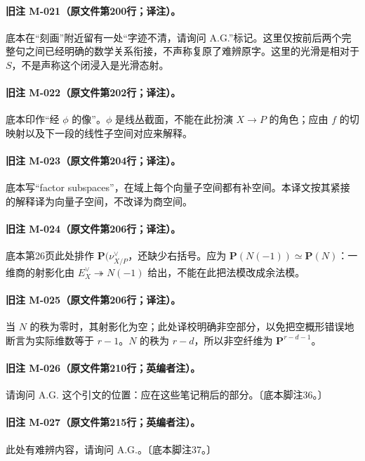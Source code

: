 \documentclass[UTF8,a4paper]{ctexbook}
\begin{document}
\paragraph{旧注 M-021（原文件第200行；译注）。}
底本在“刻画”附近留有一处“字迹不清，请询问 A.G.”标记。这里仅按前后两个完整句之间已经明确的数学关系衔接，不声称复原了难辨原字。这里的光滑是相对于 $S$，不是声称这个闭浸入是光滑态射。

\paragraph{旧注 M-022（原文件第202行；译注）。}
底本印作“经 $\phi$ 的像”。$\phi$ 是线丛截面，不能在此扮演 $X\to P$ 的角色；应由 $f$ 的切映射以及下一段的线性子空间对应来解释。

\paragraph{旧注 M-023（原文件第204行；译注）。}
底本写“factor subspaces”，在域上每个向量子空间都有补空间。本译文按其紧接的解释译为向量子空间，不改译为商空间。

\paragraph{旧注 M-024（原文件第206行；译注）。}
底本第26页此处排作 $\mathbf P(\nu_{X/P}^{\vee}$，还缺少右括号。应为 $\mathbf P(N(-1))\simeq\mathbf P(N)$：一维商的射影化由 $E_X^\vee\twoheadrightarrow N(-1)$ 给出，不能在此把法模改成余法模。

\paragraph{旧注 M-025（原文件第206行；译注）。}
当 $N$ 的秩为零时，其射影化为空；此处译校明确非空部分，以免把空概形错误地断言为实际维数等于 $r-1$。$N$ 的秩为 $r-d$，所以非空纤维为 $\mathbf P^{r-d-1}$。

\paragraph{旧注 M-026（原文件第210行；英编者注）。}
请询问 A.G. 这个引文的位置：应在这些笔记稍后的部分。〔底本脚注36。〕

\paragraph{旧注 M-027（原文件第215行；英编者注）。}
此处有难辨内容，请询问 A.G.。〔底本脚注37。〕
\end{document}
